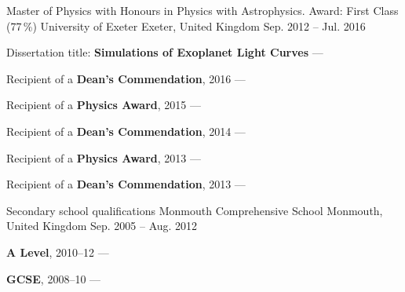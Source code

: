 \begin{cventries}
    \cventry
        {Master of Physics with Honours in Physics with Astrophysics. Award: First Class (77\,\%)} %
        {University of Exeter} %
        {Exeter, United Kingdom} %
        {Sep. 2012 -- Jul. 2016} %
        {
        \begin{cvitems} %
            \item {Dissertation title: \textbf{Simulations of Exoplanet Light Curves} --- }
            \vpaddingEdu
            \item {Recipient of a \textbf{Dean's Commendation}, 2016 --- }
            \vpaddingEdu
            \item {Recipient of a \textbf{Physics Award}, 2015 --- }
            \vpaddingEdu
            \item {Recipient of a \textbf{Dean's Commendation}, 2014 --- }
            \vpaddingEdu
            \item {Recipient of a \textbf{Physics Award}, 2013 --- }
            \vpaddingEdu
            \item {Recipient of a \textbf{Dean's Commendation}, 2013 --- }
        \end{cvitems}
        } %

    \cventry
        {Secondary school qualifications}
        {Monmouth Comprehensive School}
        {Monmouth, United Kingdom}
        {Sep. 2005 -- Aug. 2012}
        {
        \begin{cvitems}
            \item {\textbf{A Level}, 2010--12 --- }
            \vpaddingEdu
            \item {\textbf{GCSE}, 2008--10 --- }
        \end{cvitems}
        }
\end{cventries}
